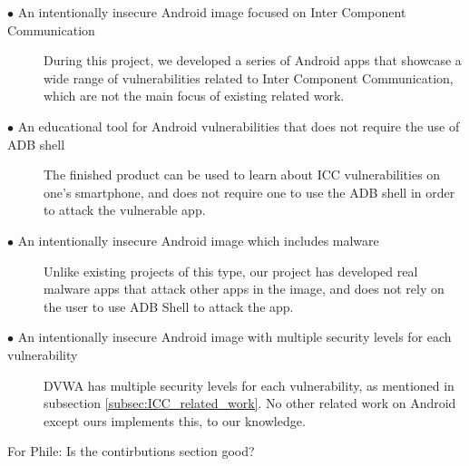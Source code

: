 		\begin{description}	
		
			\item[$\bullet$ An intentionally insecure Android image focused on Inter Component Communication]\hfill
			
			During this project, we developed a series of Android apps that showcase a wide range of vulnerabilities related to Inter Component Communication, which are not the main focus of existing related work. 
			
			\item[$\bullet$ An educational tool for Android vulnerabilities that does not require the use of ADB shell]\hfill
			
			The finished product can be used to learn about ICC vulnerabilities on one's smartphone, and does not require one to use the ADB shell in order to attack the vulnerable app.
			
			\item[$\bullet$ An intentionally insecure Android image which includes malware]\hfill
						
			Unlike existing projects of this type, our project has developed real malware apps that attack other apps in the image, and does not rely on the user to use ADB Shell to attack the app.
			
			\item[$\bullet$ An intentionally insecure Android image with multiple security levels for each vulnerability]\hfill
			
			DVWA has multiple security levels for each vulnerability, as mentioned in subsection \ref{subsec:ICC_related_work}. No other related work on Android except ours implements this, to our knowledge.
			
		\end{description}
		
		For Phile: Is the contirbutions section good?
